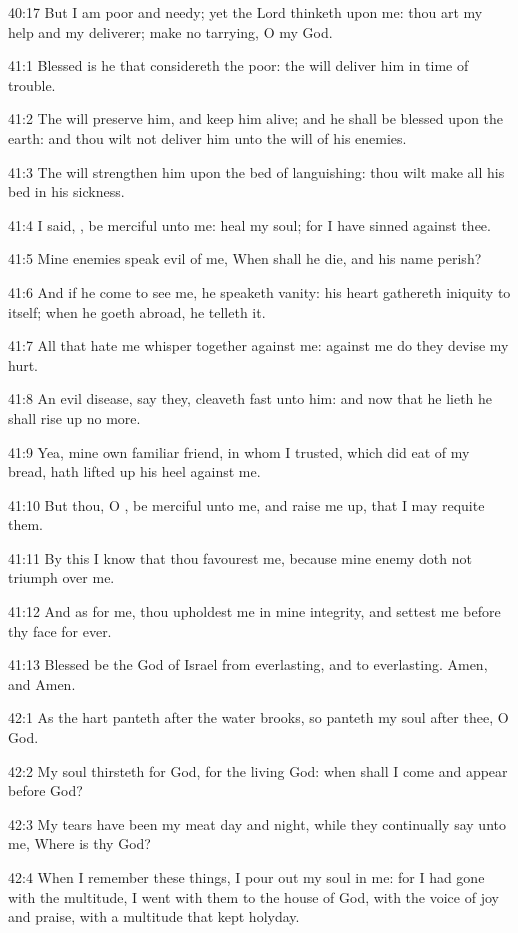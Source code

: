 40:17 But I am poor and needy; yet the Lord thinketh upon me: thou art
my help and my deliverer; make no tarrying, O my God.



41:1 Blessed is he that considereth the poor: the \LORD will deliver
him in time of trouble.

41:2 The \LORD will preserve him, and keep him alive; and he shall be
blessed upon the earth: and thou wilt not deliver him unto the will of
his enemies.

41:3 The \LORD will strengthen him upon the bed of languishing: thou
wilt make all his bed in his sickness.

41:4 I said, \LORD, be merciful unto me: heal my soul; for I have
sinned against thee.

41:5 Mine enemies speak evil of me, When shall he die, and his name
perish?

41:6 And if he come to see me, he speaketh vanity: his heart gathereth
iniquity to itself; when he goeth abroad, he telleth it.

41:7 All that hate me whisper together against me: against me do they
devise my hurt.

41:8 An evil disease, say they, cleaveth fast unto him: and now that
he lieth he shall rise up no more.

41:9 Yea, mine own familiar friend, in whom I trusted, which did eat
of my bread, hath lifted up his heel against me.

41:10 But thou, O \LORD, be merciful unto me, and raise me up, that I
may requite them.

41:11 By this I know that thou favourest me, because mine enemy doth
not triumph over me.

41:12 And as for me, thou upholdest me in mine integrity, and settest
me before thy face for ever.

41:13 Blessed be the \LORD God of Israel from everlasting, and to
everlasting. Amen, and Amen.



42:1 As the hart panteth after the water brooks, so panteth my soul
after thee, O God.

42:2 My soul thirsteth for God, for the living God: when shall I come
and appear before God?

42:3 My tears have been my meat day and night, while they continually
say unto me, Where is thy God?

42:4 When I remember these things, I pour out my soul in me: for I had
gone with the multitude, I went with them to the house of God, with
the voice of joy and praise, with a multitude that kept holyday.

